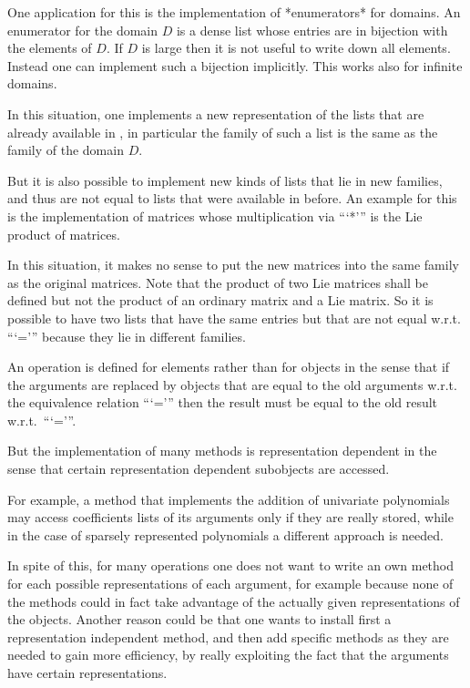 One application for this is the implementation of *enumerators*
for domains.
An enumerator for the domain $D$ is a dense list whose entries are
in bijection with the elements of $D$.
If $D$ is large then it is not useful to write down all elements.
Instead one can implement such a bijection implicitly.
This works also for infinite domains.

In this situation, one implements a new representation of the
lists that are already available in {\GAP},
in particular the family of such a list is the same as the family of
the domain $D$.

But it is also possible to implement new kinds of lists that lie in
new families, and thus are not equal to lists that were available
in {\GAP} before.
An example for this is the implementation of matrices
whose multiplication via ```*''' is the Lie product of matrices.

In this situation, it makes no sense to put the new matrices into the
same family as the original matrices.
Note that the product of two Lie matrices shall be defined but not the
product of an ordinary matrix and a Lie matrix.
So it is possible to have two lists that have the same entries but that
are not equal w.r.t. ```=''' because they lie in different families.



An operation is defined for elements rather than for objects in the sense
that if the arguments are replaced by objects that are equal to the old
arguments w.r.t. the equivalence relation ```=''' then the result must be
equal to the old result w.r.t.~```='''.

But the implementation of many methods is representation dependent in the
sense that certain representation dependent subobjects are accessed.

For example, a method that implements the addition of univariate
polynomials may access coefficients lists of its arguments
only if they are really stored,
while in the case of sparsely represented polynomials a different approach
is needed.

In spite of this, for many operations one does not want to write an own
method for each possible representations of each argument,
for example because none of the methods could in fact take advantage
of the actually given representations of the objects.
Another reason could be that one wants to install first a representation
independent method, and then add specific methods as they are needed to
gain more efficiency, by really exploiting the fact that the arguments
have certain representations.

